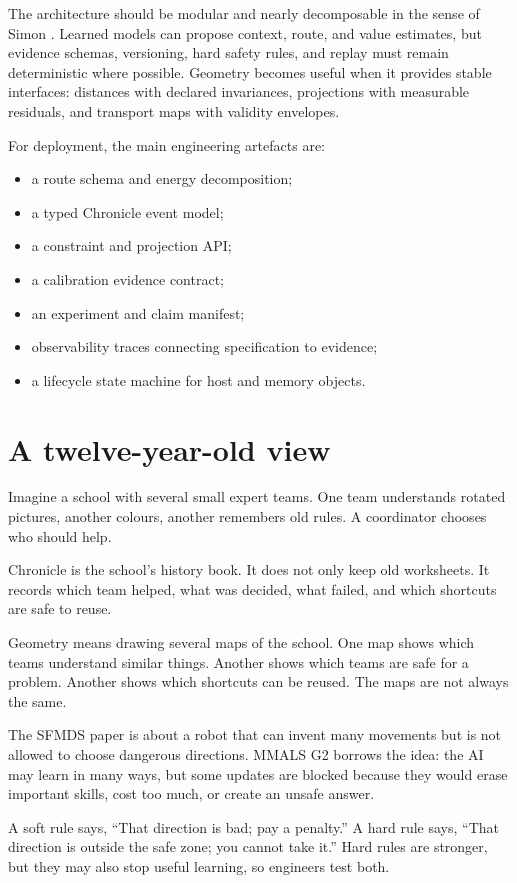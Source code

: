 \documentclass[11pt,a4paper]{article}
\begin{document}
The architecture should be modular and nearly decomposable in the sense of Simon \cite{simon1962complexity}. Learned models can propose context, route, and value estimates, but evidence schemas, versioning, hard safety rules, and replay must remain deterministic where possible. Geometry becomes useful when it provides stable interfaces: distances with declared invariances, projections with measurable residuals, and transport maps with validity envelopes.

For deployment, the main engineering artefacts are:
\begin{itemize}
\item a route schema and energy decomposition;
\item a typed Chronicle event model;
\item a constraint and projection API;
\item a calibration evidence contract;
\item an experiment and claim manifest;
\item observability traces connecting specification to evidence;
\item a lifecycle state machine for host and memory objects.
\end{itemize}

\section{A twelve-year-old view}
Imagine a school with several small expert teams. One team understands rotated pictures, another colours, another remembers old rules. A coordinator chooses who should help.

Chronicle is the school's history book. It does not only keep old worksheets. It records which team helped, what was decided, what failed, and which shortcuts are safe to reuse.

Geometry means drawing several maps of the school. One map shows which teams understand similar things. Another shows which teams are safe for a problem. Another shows which shortcuts can be reused. The maps are not always the same.

The SFMDS paper is about a robot that can invent many movements but is not allowed to choose dangerous directions. MMALS G2 borrows the idea: the AI may learn in many ways, but some updates are blocked because they would erase important skills, cost too much, or create an unsafe answer.

A soft rule says, ``That direction is bad; pay a penalty.'' A hard rule says, ``That direction is outside the safe zone; you cannot take it.'' Hard rules are stronger, but they may also stop useful learning, so engineers test both.
\end{document}
